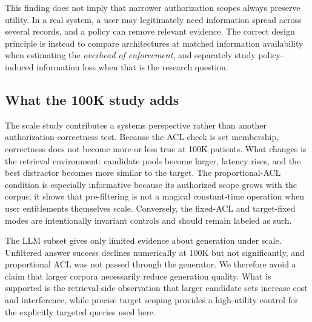 This finding does not imply that narrower authorization scopes always preserve utility. In a real system, a user may legitimately need information spread across several records, and a policy can remove relevant evidence. The correct design principle is instead to compare architectures at matched information availability when estimating the \emph{overhead of enforcement}, and separately study policy-induced information loss when that is the research question.

\subsection{What the 100K study adds}
The scale study contributes a systems perspective rather than another authorization-correctness test. Because the ACL check is set membership, correctness does not become more or less true at 100K patients. What changes is the retrieval environment: candidate pools become larger, latency rises, and the best distractor becomes more similar to the target. The proportional-ACL condition is especially informative because its authorized scope grows with the corpus; it shows that pre-filtering is not a magical constant-time operation when user entitlements themselves scale. Conversely, the fixed-ACL and target-fixed modes are intentionally invariant controls and should remain labeled as such.

The LLM subset gives only limited evidence about generation under scale. Unfiltered answer success declines numerically at 100K but not significantly, and proportional ACL was not passed through the generator. We therefore avoid a claim that larger corpora necessarily reduce generation quality. What is supported is the retrieval-side observation that larger candidate sets increase cost and interference, while precise target scoping provides a high-utility control for the explicitly targeted queries used here.
